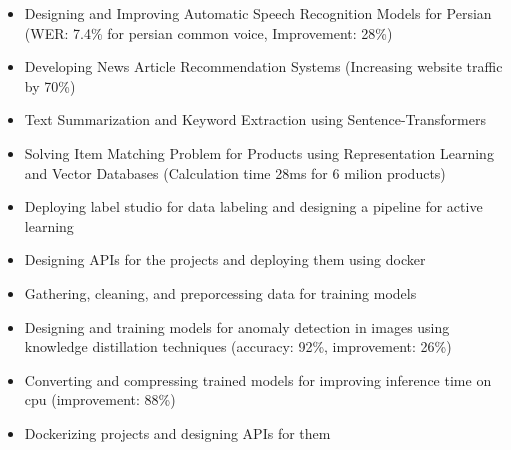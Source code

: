 \documentclass[10pt,a4paper]{altacv}
\begin{document}
\begin{paracol}{2}




	\begin{itemize}
		\justifying
		\item \small{Designing and Improving Automatic Speech Recognition Models for Persian (WER: 7.4\% for persian common voice, Improvement: 28\%)}
		\item\small{Developing News Article Recommendation Systems (Increasing website traffic by 70\%)}
		\item\small{Text Summarization and Keyword Extraction using Sentence-Transformers}
		\item\small{Solving Item Matching Problem for Products using Representation Learning and Vector Databases (Calculation time 28ms for 6 milion products)}
		\item\small{Deploying label studio for data labeling and designing a pipeline for active learning}
		\item\small{Designing APIs for the projects and deploying them using docker}
	\end{itemize}
\divider

\begin{itemize}
	\justifying
\item \small{Gathering, cleaning, and preporcessing data for  training models}
\item\small{Designing and training models for anomaly detection in images using knowledge distillation techniques (accuracy: 92\%, improvement: 26\%)}
\item\small{Converting and compressing trained models for improving inference time on cpu (improvement: 88\%)}
\item\small{Dockerizing projects and designing APIs for them}
\end{itemize}


\end{paracol}
\end{document}

